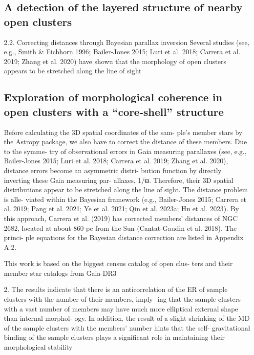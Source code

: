 \documentclass[../main.tex]{subfiles}
\begin{document}
{\subsection{A detection of the layered structure of nearby open clusters}


2.2. Correcting distances through Bayesian parallax
inversion
Several studies (see, e.g., Smith & Eichhorn 1996; Bailer-Jones
2015; Luri et al. 2018; Carrera et al. 2019; Zhang et al. 2020)
have shown that the morphology of open clusters appears to be
stretched along the line of sight

\subsection{Exploration of morphological coherence in open clusters with a “core-shell” structure}


Before calculating the 3D spatial coordinates of the sam-
ple’s member stars by the Astropy package, we also have to
correct the distance of these members. Due to the symme-
try of observational errors in Gaia measuring parallaxes (see,
e.g., Bailer-Jones 2015; Luri et al. 2018; Carrera et al. 2019;
Zhang et al. 2020), distance errors become an asymmetric distri-
bution function by directly inverting these Gaia measuring par-
allaxes, 1/ϖ. Therefore, their 3D spatial distributions appear to
be stretched along the line of sight. The distance problem is alle-
viated within the Bayesian framework (e.g., Bailer-Jones 2015;
Carrera et al. 2019; Pang et al. 2021; Ye et al. 2021; Qin et al.
2023a; Hu et al. 2023). By this approach, Carrera et al. (2019)
has corrected members’ distances of NGC 2682, located at about
860 pc from the Sun (Cantat-Gaudin et al. 2018). The princi-
ple equations for the Bayesian distance correction are listed in
Appendix A.2.

This work is based on the biggest census catalog of open clus-
ters and their member star catalogs from Gaia-DR3

2. The results indicate that there is an anticorrelation of the
ER of sample clusters with the number of their members, imply-
ing that the sample clusters with a vast number of members may
have much more elliptical external shape than internal morphol-
ogy. In addition, the result of a slight shrinking of the MD of the
sample clusters with the members’ number hints that the self-
gravitational binding of the sample clusters plays a significant
role in maintaining their morphological stability

}
\end{document}
